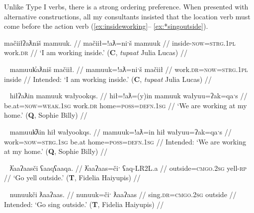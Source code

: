 Unlike Type I verbs, there is a strong ordering preference. When presented with alternative constructions, all my consultants insisted that the location verb must come before the action verb (\ref{ex:insideworking}-- \ref{ex:*singoutside}). 

\ex \label{ex:insideworking}
\begingl
\glpreamble mačiiłʔaƛniš mamuuk. //
\gla mačiił=!aƛ=niˑš mamuuk  //
\glb inside-\textsc{now}=\textsc{strg.1pl} work.\textsc{dr} //
\glft `I am working inside.' (\textbf{C}, \textit{tupaat} Julia Lucas) //
\endgl
\xe

\ex~ \label{ex:*insideworking}
\begingl
\glpreamble *mamuuk̓aƛniš mačiił. //
\gla mamuuk=!aƛ=niˑš mačiił //
\glb work.\textsc{dr}=\textsc{now}=\textsc{strg.1pl} inside //
\glft Intended: `I am working inside.' (\textbf{C}, \textit{tupaat} Julia Lucas) //
\endgl
\xe

\ex~ \label{ex:workathome}
\begingl
\glpreamble hiłʔaƛin mamuuk wałyookqs. //
\gla hił=!aƛ=(y)in mamuuk wałyuu=ʔak=qaˑs  //
\glb be.at=\textsc{now}=\textsc{weak.1sg} work.\textsc{dr} home=\textsc{poss}=\textsc{defn.1sg} //
\glft `We are working at my home.' (\textbf{Q}, Sophie Billy) //
\endgl
\xe

\ex~ \label{ex:*workathome}
\begingl
\glpreamble *mamuuk̓ƛin hił wałyookqs. //
\gla mamuuk=!aƛ=in hił wałyuu=ʔak=qaˑs  //
\glb work=\textsc{now}=\textsc{strg.1sg} be.at home=\textsc{poss}=\textsc{defn.1sg} //
\glft Intended: `We are working at my home.' (\textbf{Q}, Sophie Billy) //
\endgl
\xe

\ex~ \label{ex:shoutoutside}
\begingl
\glpreamble ƛ̓aaʔaasči ʕaaqʕaaqa. //
\gla ƛ̓aaʔaas=čiˑ ʕaq-LR2L.a  //
\glb outside=\textsc{cmgo.2sg} yell-\textsc{rp} //
\glft `Go yell outside.' (\textbf{T}, Fidelia Haiyupis) //
\endgl
\xe

\ex~ \label{ex:*singoutside}
\begingl
\glpreamble *nunuukči ƛaaʔaas. //
\gla nunuuk=čiˑ ƛaaʔaas  //
\glb sing.\textsc{dr}=\textsc{cmgo.2sg} outside //
\glft Intended: `Go sing outside.'\footnotemark{} (\textbf{T}, Fidelia Haiyupis) //
\endgl
\xe



